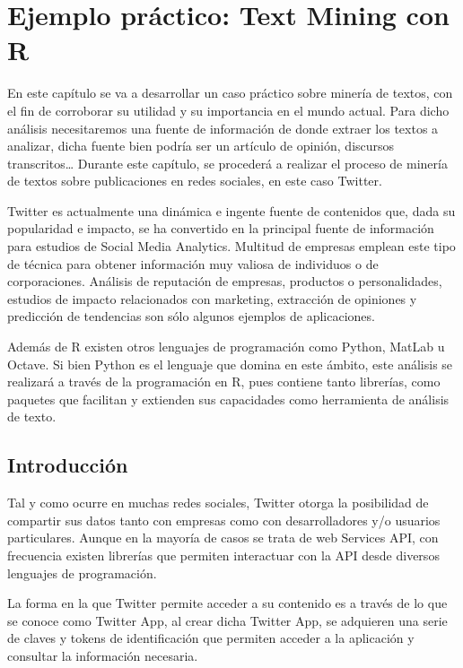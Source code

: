 \chapter{Ejemplo práctico: Text Mining con R}
\label{cha:Text-mining-r}

En este capítulo se va a desarrollar un caso práctico sobre minería de textos, con el fin de corroborar 
su utilidad y su importancia en el mundo actual. Para dicho análisis necesitaremos una fuente de 
información de donde extraer los textos a analizar, dicha fuente bien podría ser un artículo de opinión, 
discursos transcritos… Durante este capítulo, se procederá a realizar el proceso de minería de textos 
sobre publicaciones en redes sociales, en este caso Twitter.

Twitter es actualmente una dinámica e ingente fuente de contenidos que, dada su popularidad e impacto, 
se ha convertido en la principal fuente de información para estudios de Social Media Analytics. Multitud 
de empresas emplean este tipo de técnica para obtener información muy valiosa de individuos o de 
corporaciones. Análisis de reputación de empresas, productos o personalidades, estudios de impacto 
relacionados con marketing, extracción de opiniones y predicción de tendencias son sólo algunos ejemplos 
de aplicaciones.

Además de R existen otros lenguajes de programación como Python, MatLab u Octave. Si bien Python es el 
lenguaje que domina en este ámbito, este análisis se realizará a través de la programación en R, pues 
contiene tanto librerías, como paquetes que facilitan y extienden sus capacidades como herramienta de 
análisis de texto.


\section{Introducción}
\label{sec:introduccion}

Tal y como ocurre en muchas redes sociales, Twitter otorga la posibilidad de compartir sus datos tanto 
con empresas como con desarrolladores y/o usuarios particulares. Aunque en la mayoría de casos se trata 
de web Services API, con frecuencia existen librerías que permiten interactuar con la API desde diversos 
lenguajes de programación. 

La forma en la que Twitter permite acceder a su contenido es a través de lo que se conoce como Twitter 
App, al crear dicha Twitter App, se adquieren una serie de claves y tokens de identificación que 
permiten acceder a la aplicación y consultar la información necesaria.  

